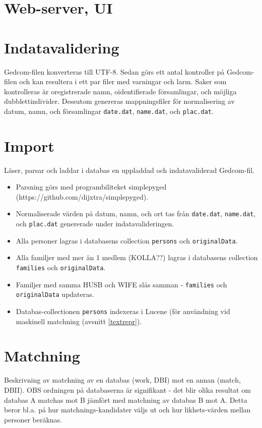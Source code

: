 \documentclass[swedish,11pt]{article}
\begin{document}
\section{Web-server, UI}
\label{UI}

\section{Indatavalidering}
\label{indatavalidering}
Gedcom-filen konverteras till UTF-8. Sedan
görs ett antal kontroller på Gedcom-filen och kan resultera i
ett par filer med varningar och larm. Saker som kontrolleras är oregistrerade namn,
oidentifierade församlingar, och möjliga dubblettindivider.
Dessutom genereras
mappningsfiler för normalisering av datum, namn, och församlingar
\verb+date.dat+, \verb+name.dat+, och \verb+plac.dat+.
\section{Import}
\label{import}
Läser, parsar och laddar i databas en uppladdad och indatavaliderad
Gedcom-fil.
\begin{itemize}
\item Parsning
görs med programbiliteket simplepyged
(https://github.com/dijxtra/simplepyged).
\item Normaliserade värden på datum, namn, och ort tas från
  \verb+date.dat+, \verb+name.dat+, och \verb+plac.dat+ genererade
  under indatavalideringen.
\item Alla personer lagras i databasens collection \verb+persons+ och \verb+originalData+.
\item Alla familjer med mer än 1 medlem (KOLLA??) lagras i databasens collection
  \verb+families+ och \verb+originalData+.
\item Familjer med samma HUSB och WIFE slås samman - \verb+families+
  och \verb+originalData+ updateras.
\item Databas-collectionen \verb+persons+ indexeras i Lucene (för
  användning vid maskinell matchning (avsnitt \ref{textrepr}).
\end{itemize}

\section{Matchning}
\label{match}
Beskrivning av matchning av en databas (work, DBI) mot en annan
(match, DBII). OBS ordningen på databaserna är signifikant - det blir
olika resultat om databas A matchas mot B jämfört med matchning av
databas B mot A. Detta beror bl.a. på hur matchnings-kandidater väljs
ut och hur likhets-värden mellan personer beräknas.
\end{document}
